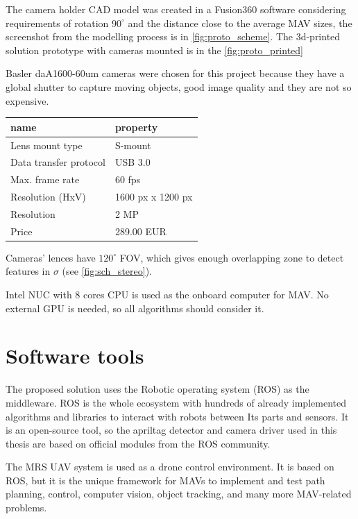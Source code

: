 The camera holder CAD model was created in a Fusion360 software considering requirements of rotation $90^\circ$ and the distance close to the average MAV sizes, the screenshot from the modelling process is in \autoref{fig:proto_scheme}.
The 3d-printed solution prototype with cameras mounted is in the \autoref{fig:proto_printed}

Basler daA1600-60um cameras were chosen for this project because they have a global shutter to capture moving objects, good image quality and they are not so expensive.
\begin{center}
    \begin{tabular}{ l l }
    \hline
    name                   & property          \\ \hline
    Lens mount type        & S-mount           \\
    Data transfer protocol & USB 3.0           \\
    Max. frame rate        & 60 fps            \\
    Resolution (HxV)       & 1600 px x 1200 px \\
    Resolution             & 2 MP              \\
    Price                  & 289.00 EUR        \\ \hline
    \end{tabular}
\end{center}

Cameras' lences have $120^\circ$ FOV, which gives enough overlapping zone to detect features in $\sigma$ (see \autoref{fig:sch_stereo}).

Intel NUC with 8 cores CPU is used as the onboard computer for MAV. 
No external GPU is needed, so all algorithms should consider it.

\section{Software tools}
\label{sec:impl_software}

The proposed solution uses the Robotic operating system (ROS)\cite{Rospaper} as the middleware.
ROS is the whole ecosystem with hundreds of already implemented algorithms and libraries to interact with robots between Its parts and sensors.
It is an open-source tool, so the apriltag detector and camera driver used in this thesis are based on official modules from the ROS community.

The MRS UAV system \cite{Baca2021} is used as a drone control environment. It is based on ROS, but it is the unique framework for MAVs to implement and test path planning, control, computer vision, object tracking, and many more MAV-related problems.

